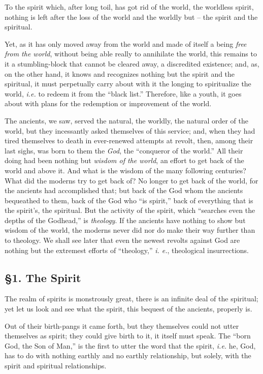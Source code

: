 \documentclass[12pt,a4paper]{book}
\begin{document}
To the spirit which, after long toil, has got rid of the world, the worldless 
spirit, nothing is left after the loss of the world and the worldly but -- the 
spirit and the spiritual.

Yet, as it has only moved away from the world and made of itself a being 
\textit{free from the world}, without being able really to annihilate the 
world, this remains to it a stumbling-block that cannot be cleared away, a 
discredited existence; and, as, on the other hand, it knows and recognizes 
nothing but the spirit and the spiritual, it must perpetually carry about with 
it the longing to spiritualize the world, \textit{i.e.} to redeem it from the 
``black list.'' Therefore, like a youth, it goes about with plans for the 
redemption or improvement of the world.

The ancients, we saw, served the natural, the worldly, the natural order of 
the world, but they incessantly asked themselves of this service; and, when 
they had tired themselves to death in ever-renewed attempts at revolt, then, 
among their last sighs, was born to them the \textit{God}, the ``conqueror of 
the world.'' All their doing had been nothing but \textit{wisdom of the 
world}, an effort to get back of the world and above it. And what is the 
wisdom of the many following centuries? What did the moderns try to get back 
of? No longer to get back of the world, for the ancients had accomplished 
that; but back of the God whom the ancients bequeathed to them, back of the 
God who ``is spirit,'' back of everything that is the spirit's, the 
spiritual. But the activity of the spirit, which ``searches even the depths 
of the Godhead,'' is \textit{theology}. If the ancients have nothing to show 
but wisdom of the world, the moderns never did nor do make their way further 
than to theology. We shall see later that even the newest revolts against God 
are nothing but the extremest efforts of ``theology,'' \textit{i. e.}, 
theological insurrections.

\subsection[\S{}1. The Spirit]{\centering \S{}1. The Spirit}

The realm of spirits is monstrously great, there is an infinite deal of the 
spiritual; yet let us look and see what the spirit, this bequest of the 
ancients, properly is.

Out of their birth-pangs it came forth, but they themselves could not utter 
themselves as spirit; they could give birth to it, it itself must speak. The 
``born God, the Son of Man,'' is the first to utter the word that the 
spirit, \textit{i.e.} he, God, has to do with nothing earthly and no earthly 
relationship, but solely, with the spirit and spiritual relationships.
\end{document}
